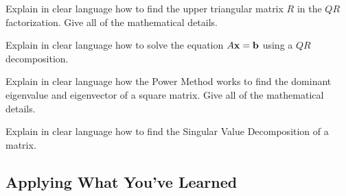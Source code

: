 \begin{problem}
    Explain in clear language how to find the upper triangular matrix $R$ in the $QR$
    factorization.  Give all of the mathematical details.
\end{problem}

\begin{problem}
    Explain in clear language how to solve the equation $A {\bf x} = {\bf b}$ using a $QR$
    decomposition.
\end{problem}

\begin{problem}
    Explain in clear language how the Power Method works to find the dominant eigenvalue
    and eigenvector of a square matrix.  Give all of the mathematical details.
\end{problem}

\begin{problem}
    Explain in clear language how to find the Singular Value Decomposition of a matrix.
\end{problem}

\subsection{Applying What You've Learned}


